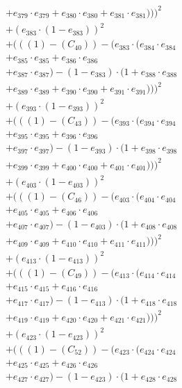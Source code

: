 \documentclass[10pt, a4paper]{article}
\begin{document}
\begin{small}
\begin{align*}
& + e_{379} \cdot e_{379} + e_{380} \cdot e_{380} + e_{381} \cdot e_{381})))^{2} \\
& + (e_{383} \cdot (1 - e_{383}))^{2} \\
& + (((1) - (C_{40})) - (e_{383} \cdot (e_{384} \cdot e_{384} \\
& + e_{385} \cdot e_{385} + e_{386} \cdot e_{386} \\
& + e_{387} \cdot e_{387}) - (1 - e_{383}) \cdot (1 + e_{388} \cdot e_{388} \\
& + e_{389} \cdot e_{389} + e_{390} \cdot e_{390} + e_{391} \cdot e_{391})))^{2} \\
& + (e_{393} \cdot (1 - e_{393}))^{2} \\
& + (((1) - (C_{43})) - (e_{393} \cdot (e_{394} \cdot e_{394} \\
& + e_{395} \cdot e_{395} + e_{396} \cdot e_{396} \\
& + e_{397} \cdot e_{397}) - (1 - e_{393}) \cdot (1 + e_{398} \cdot e_{398} \\
& + e_{399} \cdot e_{399} + e_{400} \cdot e_{400} + e_{401} \cdot e_{401})))^{2} \\
& + (e_{403} \cdot (1 - e_{403}))^{2} \\
& + (((1) - (C_{46})) - (e_{403} \cdot (e_{404} \cdot e_{404} \\
& + e_{405} \cdot e_{405} + e_{406} \cdot e_{406} \\
& + e_{407} \cdot e_{407}) - (1 - e_{403}) \cdot (1 + e_{408} \cdot e_{408} \\
& + e_{409} \cdot e_{409} + e_{410} \cdot e_{410} + e_{411} \cdot e_{411})))^{2} \\
& + (e_{413} \cdot (1 - e_{413}))^{2} \\
& + (((1) - (C_{49})) - (e_{413} \cdot (e_{414} \cdot e_{414} \\
& + e_{415} \cdot e_{415} + e_{416} \cdot e_{416} \\
& + e_{417} \cdot e_{417}) - (1 - e_{413}) \cdot (1 + e_{418} \cdot e_{418} \\
& + e_{419} \cdot e_{419} + e_{420} \cdot e_{420} + e_{421} \cdot e_{421})))^{2} \\
& + (e_{423} \cdot (1 - e_{423}))^{2} \\
& + (((1) - (C_{52})) - (e_{423} \cdot (e_{424} \cdot e_{424} \\
& + e_{425} \cdot e_{425} + e_{426} \cdot e_{426} \\
& + e_{427} \cdot e_{427}) - (1 - e_{423}) \cdot (1 + e_{428} \cdot e_{428} \\

\end{align*}
\end{small}
\end{document}
